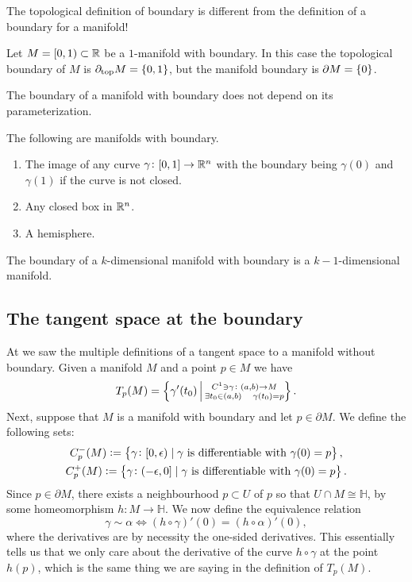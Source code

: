 \documentclass[11pt,a4paper]{article}
\begin{document}
\begin{remark}
  The topological definition of boundary
  is different from the definition of a boundary for a manifold!
\end{remark}

\begin{example}
  Let $M = [0,1) \subset \mathbb{R}$ be a $1$-manifold with boundary.
  In this case the topological boundary of $M$ is
  $\partial_{\text{top}} M = \left\{0,1\right\}$,
  but the manifold boundary is $\partial M = \left\{0\right\}$.
\end{example}

\begin{remark}
  The boundary of a manifold with boundary does not depend on its
  parameterization.
\end{remark}

\begin{example}
  The following are manifolds with boundary.
  \begin{enumerate}
    \item[(1)] The image of any curve $\gamma \colon [0,1] \to \mathbb{R}^n$
      with the boundary being $\gamma(0)$ and $\gamma(1)$ if the curve
      is not closed.
    \item[(2)] Any closed box in $\mathbb{R}^n$.
    \item[(3)] A hemisphere.
  \end{enumerate}
\end{example}

\begin{remark}
  The boundary of a $k$-dimensional manifold with boundary is
  a $k-1$-dimensional manifold.
\end{remark}

\subsection{The tangent space at the boundary}
At  we saw the multiple definitions of a tangent
space to a manifold without boundary.
Given a manifold $M$ and a point $p \in M$ we have
\[
  T_p(M) =
    \left\{\gamma'(t_0) \,\middle\vert\,
      \substack{
      C^1 \ni \gamma \colon (a,b) \to M \\
      \exists t_0 \in (a,b) \quad \gamma(t_0) = p}\right\}.
\]
Next, suppose that $M$ is a manifold with boundary and let $p \in \partial M$.
We define the following sets:
\begin{gather*}
  C^{-}_p(M) := \left\{\gamma \colon [0,\epsilon) \mid \gamma \text{ is differentiable with } \gamma(0) = p\right\}, \\
  C^{+}_p(M) := \left\{\gamma \colon (-\epsilon,0] \mid \gamma \text{ is differentiable with } \gamma(0) = p\right\}.
\end{gather*}
Since $p \in \partial M$,
there exists a neighbourhood $p \subset U$ of $p$ so that
$U \cap M \cong \mathbb H$, by some homeomorphism $h \colon M \to \mathbb H$.
We now define the equivalence relation
\[
  \gamma \sim \alpha \iff
  (h \circ \gamma)'(0) = (h \circ \alpha)'(0),
\]
where the derivatives are by necessity the one-sided derivatives.
This essentially tells us that we only care about the derivative of the curve
$h \circ \gamma$ at the point $h(p)$,
which is the same thing we are saying in the definition of $T_p(M)$.
\end{document}

